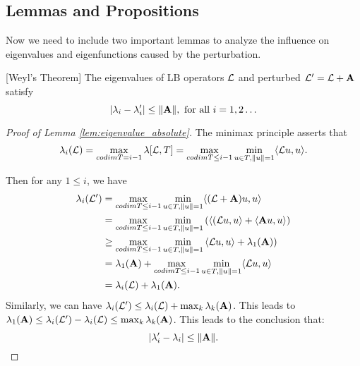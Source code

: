 \subsection{Lemmas and Propositions}

Now we need to include two important lemmas to analyze the influence on eigenvalues and eigenfunctions caused by the perturbation.
\begin{lemma}\label{lem:eigenvalue_absolute}[Weyl's Theorem]
The eigenvalues of LB operators ${\mathcal L}$ and perturbed ${\mathcal L}'={\mathcal L}+{\mathbf A}$ satisfy
\begin{equation}
|\lambda_i-\lambda'_i|\leq \|{\mathbf A}\|, \text{ for all }i=1,2\hdots
\end{equation}
\end{lemma}
\begin{proof}[Proof of Lemma \ref{lem:eigenvalue_absolute}]

The minimax principle asserts that
\begin{align}
    \lambda_i({\mathcal L})=\max_{codim T = i-1}\lambda[{\mathcal L}, T]=\max_{codim T \leq i-1} \min_{u\in T, \|u\|=1} \langle {\ensuremath{\mathcal L}} u, u \rangle.
\end{align}

Then for any $1\leq i $, we have
\begin{align}
    \lambda_i({\mathcal L}') &=\max_{codim T\leq i-1} \min_{ u\in T, \|u\|=1}  \langle ({\mathcal L}+{\mathbf A}) u, u\rangle \\
    & = \max_{codim T\leq i-1} \min_{ u\in T, \|u\|=1} \left( \langle  ({\mathcal L}  u, u\rangle + \langle {\ensuremath{\mathbf A}} u, u\rangle   \right)\\
    & \geq \max_{codim T\leq i-1} \min_{  u\in T, \|u\|=1}  \left\langle  {\ensuremath{\mathcal L}}  u, u\rangle   + \lambda_1({\mathbf A}) \right)\\
    & = \lambda_1({\mathbf A})+ \max_{codim T\leq i-1} \min_{  u\in T, \|u\|=1 } \langle  {\ensuremath{\mathcal L}}  u, u\rangle  \\
    & = \lambda_i({\mathcal L})+\lambda_1({\mathbf A}).
\end{align}
Similarly, we can have $\lambda_i({\mathcal L}') \leq \lambda_i({\mathcal L})+ \max_k\lambda_k({\mathbf A})$. This leads to $\lambda_1({\mathbf A})\leq \lambda_i({\mathcal L}' )-\lambda_i({\mathcal L}) \leq \max_k\lambda_k({\mathbf A})$. This leads to the conclusion that:
\begin{equation}
    |\lambda'_i-\lambda_i|\leq \|{\mathbf A}\|.
\end{equation}
\end{proof}

